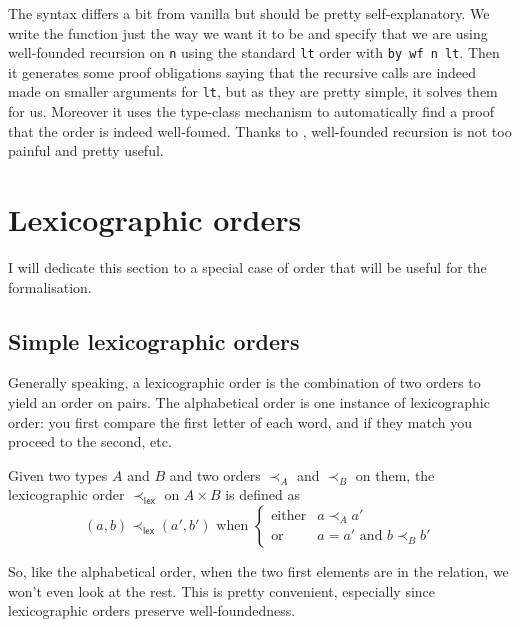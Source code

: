 The syntax differs a bit from vanilla \Coq but should be pretty
self-explanatory. We write the function just the way we want it to be and
specify that we are using well-founded recursion on \texttt{n}
using the standard \texttt{lt} order with \texttt{by wf n lt}.
Then it generates some proof obligations saying that the recursive calls are
indeed made on smaller arguments for \texttt{lt}, but as they are
pretty simple, it solves them for us.
Moreover it uses the type-class mechanism to automatically find a proof that
the order is indeed well-founed.
Thanks to \Equations, well-founded recursion is not too painful and pretty
useful.

\section{Lexicographic orders}

I will dedicate this section to a special case of order that will be useful for
the formalisation.

\subsection{Simple lexicographic orders}

Generally speaking, a lexicographic order is the combination of two orders to
yield an order on pairs. The alphabetical order is one instance of lexicographic
order: you first compare the first letter of each word, and if they match you
proceed to the second, etc.

\begin{definition}
  Given two types \(A\) and \(B\) and two orders \(\prec_A\) and \(\prec_B\)
  on them, the lexicographic order \(\prec_{\mathsf{lex}}\) on \(A \times B\)
  is defined as
  \[
    (a,b) \prec_{\mathsf{lex}} (a',b')
    \text{ when }
    \left\{
    \begin{array}{ll}
      \text{either} & a \prec_A a' \\
      \text{or} & a = a' \text{ and } b \prec_B b'
    \end{array}
    \right.
  \]
\end{definition}

So, like the alphabetical order, when the two first elements are in the
relation, we won't even look at the rest.
This is pretty convenient, especially since lexicographic orders preserve
well-foundedness.

